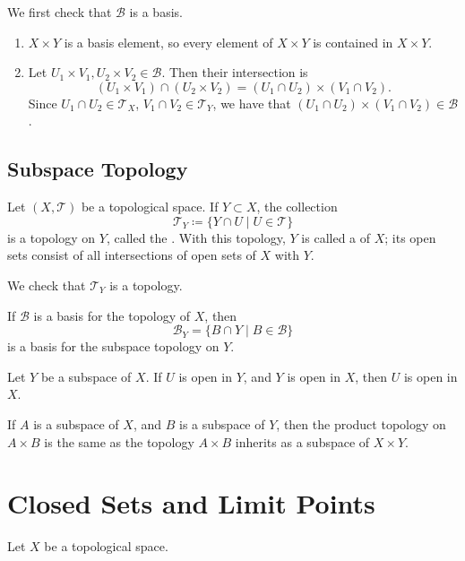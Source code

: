 We first check that $\mathcal{B}$ is a basis.
\begin{enumerate}[label=(\roman*)]
\item $X\times Y$ is a basis element, so every element of $X\times Y$ is contained in $X\times Y$.
\item Let $U_1\times V_1,U_2\times V_2\in\mathcal{B}$. Then their intersection is
\[(U_1\times V_1)\cap(U_2\times V_2)=(U_1\cap U_2)\times(V_1\cap V_2).\]
Since $U_1\cap U_2\in\mathcal{T}_X$, $V_1\cap V_2\in\mathcal{T}_Y$, we have that $(U_1\cap U_2)\times(V_1\cap V_2)\in\mathcal{B}$.
\end{enumerate}

\subsection{Subspace Topology}
\begin{definition}[Subspace]
Let $(X,\mathcal{T})$ be a topological space. If $Y\subset X$, the collection
\[\mathcal{T}_Y\coloneqq\{Y\cap U\mid U\in\mathcal{T}\}\]
is a topology on $Y$, called the . With this topology, $Y$ is called a  of $X$; its open sets consist of all intersections of open sets of $X$ with $Y$.
\end{definition}

We check that $\mathcal{T}_Y$ is a topology.

\begin{lemma}
If $\mathcal{B}$ is a basis for the topology of $X$, then
\[\mathcal{B}_Y=\{B\cap Y\mid B\in\mathcal{B}\}\]
is a basis for the subspace topology on $Y$.
\end{lemma}

\begin{lemma}
Let $Y$ be a subspace of $X$. If $U$ is open in $Y$, and $Y$ is open in $X$, then $U$ is open in $X$.
\end{lemma}

\begin{proposition}
If $A$ is a subspace of $X$, and $B$ is a subspace of $Y$, then the product topology on $A\times B$ is the same as the topology $A\times B$ inherits as a subspace of $X\times Y$.
\end{proposition}
\pagebreak

\section{Closed Sets and Limit Points}
Let $X$ be a topological space.

